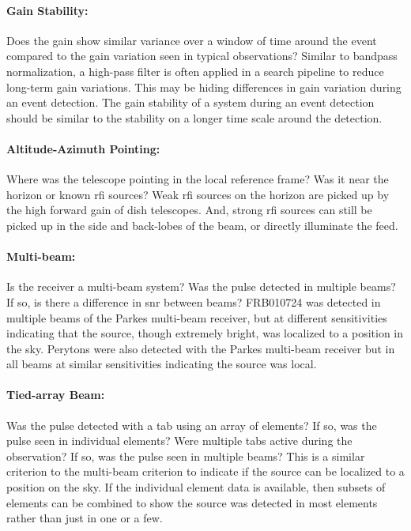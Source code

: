 \documentclass[a4paper,fleqn,usenatbib]{mnras}
\begin{document}
\paragraph{Gain Stability:}

Does the gain show similar variance over a window of time around the event
compared to the gain variation seen in typical observations? Similar to bandpass
normalization, a high-pass filter is often applied in a search pipeline to
reduce long-term gain variations. This may be hiding differences in gain
variation during an event detection. The gain stability of a system during an
event detection should be similar to the stability on a longer time scale around
the detection.

\paragraph{Altitude-Azimuth Pointing:}

Where was the telescope pointing in the local reference frame? Was it near the
horizon or known \gls{rfi} sources? Weak \gls{rfi} sources on the horizon are
picked up by the high forward gain of dish telescopes. And, strong \gls{rfi}
sources can still be picked up in the side and back-lobes of the beam, or
directly illuminate the feed.

\paragraph{Multi-beam:}

Is the receiver a multi-beam system? Was the pulse detected in multiple beams?
If so, is there a difference in \gls{snr} between beams? FRB010724
\citep{2007Sci...318..777L} was detected in multiple beams of the Parkes
multi-beam receiver, but at different sensitivities indicating that the source,
though extremely bright, was localized to a position in the sky. Perytons were
also detected with the Parkes multi-beam receiver but in all beams at similar
sensitivities indicating the source was local.

\paragraph{Tied-array Beam:}

Was the pulse detected with a \gls{tab} using an array of elements? If so, was
the pulse seen in individual elements? Were multiple \glspl{tab} active during
the observation? If so, was the pulse seen in multiple beams? This is a similar
criterion to the multi-beam criterion to indicate if the source can be localized
to a position on the sky. If the individual element data is available, then
subsets of elements can be combined to show the source was detected in most
elements rather than just in one or a few.
\end{document}
